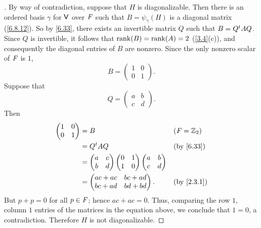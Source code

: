 \begin{proof}[]
  By way of contradiction, suppose that \(H\) is diagonalizable.
  Then there is an ordered basis \(\gamma\) for \(\mathsf{V}\) over \(\mathit{F}\) such that \(B = \psi_{\gamma}(H)\) is a diagonal matrix (\cref{6.8.12}).
  So by \cref{6.33}, there exists an invertible matrix \(Q\) such that \(B = {Q}^{t} A Q\).
  Since \(Q\) is invertible, it follows that \(\rk{B} = \rk{A} = 2\) (\cref{3.4}(c)), and consequently the diagonal entries of \(B\) are nonzero.
  Since the only nonzero scalar of \(\mathit{F}\) is \(1\),
  \[
    B = \begin{pmatrix}
      1 & 0 \\
      0 & 1
    \end{pmatrix}.
  \]
  Suppose that
  \[
    Q = \begin{pmatrix}
      a & b \\
      c & d
    \end{pmatrix}.
  \]
  Then
  \begin{align*}
    \begin{pmatrix}
      1 & 0 \\
      0 & 1
    \end{pmatrix} & = B                           &  & (\F = \Z_2) \\
                    & = \tp{Q} A Q                  &  & \by{6.33} \\
                    & = \begin{pmatrix}
                          a & c \\
                          b & d
                        \end{pmatrix} \begin{pmatrix}
                                        0 & 1 \\
                                        1 & 0
                                      \end{pmatrix} \begin{pmatrix}
                                                      a & b \\
                                                      c & d
                                                    \end{pmatrix} \\
                    & = \begin{pmatrix}
                          ac + ac & bc + ad \\
                          bc + ad & bd + bd
                        \end{pmatrix}.          &  & \by{2.3.1}
  \end{align*}
  But \(p + p = 0\) for all \(p \in \mathit{F}\);
  hence \(ac + ac = 0\).
  Thus, comparing the row \(1\), column \(1\) entries of the matrices in the equation above, we conclude that \(1 = 0\), a contradiction.
  Therefore \(H\) is not diagonalizable.
\end{proof}

